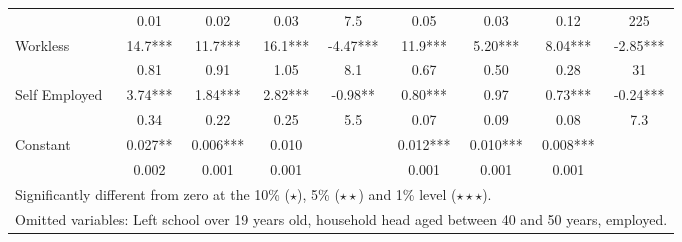 \begin{table}
\begin{tabular}{l|cccc|cccc}
                    	&	       0.01   	&	0.02	&	0.03	&	7.5	&	    
				   0.05  	&	0.03	&	0.12	&	225	\\
Workless	&	       14.7***	&	       11.7***	&	       16.1***	&	-4.47***	&	       					11.9***	&	      5.20***	&	       8.04***	&	-2.85***	\\
	&	       0.81   	&	0.91	&	1.05	&	8.1	&	
		       0.67   	&	0.50	&	0.28	&	31	\\
Self Employed	&	       3.74***	&	      1.84***	&	       2.82***	&	-0.98**	&	       							0.80***	&	       0.97&	       0.73***	&	-0.24***	\\
	&	       0.34   	&	0.22	&	0.25	&	5.5	&	
		       0.07   	&	0.09	&	0.08	&	7.3	\\
Constant            	&	       0.027**	&	       0.006***	&	0.010	&		&	
				       0.012***	&	       0.010***	&	       0.008***	&		\\
                    	&	       0.002   	&	0.001	&	       0.001 	&		&	 
			      0.001   	&	0.001	&	0.001	&		\\
\hline\hline
\multicolumn{9}{l}{Significantly different from zero at the 10\% ($\star$),  5\% ($\star\star$) and 1\% level ($\star\star\star$).} \\
\multicolumn{9}{l}{Omitted variables: Left school over 19 years old, household head aged between 40 and 50 years, employed. } 
\end{tabular}
\label{table:ahc_bhc}
\end{table}

